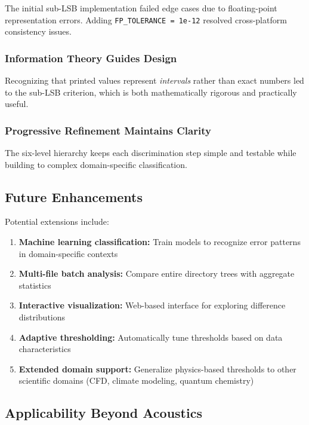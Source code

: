 \documentclass[11pt,letterpaper]{article}
\begin{document}
The initial sub-LSB implementation failed edge cases due to floating-point representation errors. Adding \texttt{FP\_TOLERANCE = 1e-12} resolved cross-platform consistency issues.

\subsubsection{Information Theory Guides Design}

Recognizing that printed values represent \emph{intervals} rather than exact numbers led to the sub-LSB criterion, which is both mathematically rigorous and practically useful.

\subsubsection{Progressive Refinement Maintains Clarity}

The six-level hierarchy keeps each discrimination step simple and testable while building to complex domain-specific classification.

\subsection{Future Enhancements}

Potential extensions include:

\begin{enumerate}
    \item \textbf{Machine learning classification:} Train models to recognize error patterns in domain-specific contexts

    \item \textbf{Multi-file batch analysis:} Compare entire directory trees with aggregate statistics

    \item \textbf{Interactive visualization:} Web-based interface for exploring difference distributions

    \item \textbf{Adaptive thresholding:} Automatically tune thresholds based on data characteristics

    \item \textbf{Extended domain support:} Generalize physics-based thresholds to other scientific domains (CFD, climate modeling, quantum chemistry)
\end{enumerate}

\subsection{Applicability Beyond Acoustics}
\end{document}
